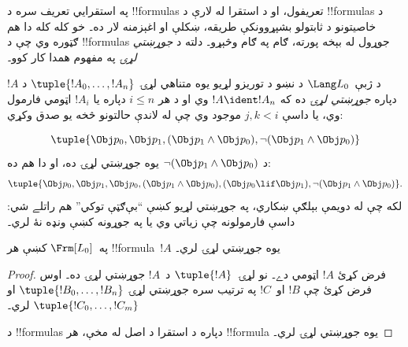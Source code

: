 \documentclass[../../../include/open-logic-section]{subfiles}
\begin{document}


په استقرايي تعريف سره د !!{formula}s تعريفول، او د استقرا له لارې
د !!{formula}s د خاصيتونو د ثابتولو بشپړوونکې طريقه، ښکلې او اغېزمنه
لار ده۔ خو کله کله دا هم ګټوره وي چې د !!{formula}s جوړول له بېخه
پورته، ګام په ګام وڅېړو۔ دلته د \emph{جوړښتي لړۍ} په مفهوم همدا کار
کوو۔

\begin{defn}
د ژبې~$\Lang L_0$ د نښو د توريزو لړيو يوه متناهي لړۍ
$\tuple{!A_0,\dotsc,!A_n}$ د $!A$ دپاره \emph{جوړښتي لړۍ} ده که
$!A \ident !A_n$ وي او د هر $i \leq n$ دپاره يا $!A_i$ اټومي
فارمول وي، يا داسې $j,k < i$ موجود وي چې له لاندې حالتونو څخه يو
صدق وکړي:
\begin{enumerate}
\end{enumerate}
\end{defn}

\begin{ex}
\[
\tuple{
    \Obj p_0,
    \Obj p_1,
    (\Obj p_1 \land \Obj p_0),
    \lnot (\Obj p_1 \land \Obj p_0)
}
\]
د $\lnot (\Obj p_1 \land \Obj p_0)$ يوه جوړښتي لړۍ ده، او دا هم ده:
\[
\tuple{
    \Obj p_0,
    \Obj p_1,
    \Obj p_0,
    (\Obj p_1 \land \Obj p_0),
    (\Obj p_0 \lif \Obj p_1),
    \lnot (\Obj p_1 \land \Obj p_0)
}.
\]
%
لکه چې له دويمې بېلګې ښکاري، په جوړښتي لړيو کښې ``بې‌ګټې توکي''
هم راتلے شي: داسې فارمولونه چې زياتي وي يا په جوړونه کښې ونډه نۀ
لري۔
\end{ex}

\begin{prop}
په~$\Frm[L_0]$ کښې هر !!{formula}~$!A$ يوه جوړښتي لړۍ لري۔
\end{prop}

\begin{proof}
فرض کړئ $!A$ اټومي دے۔ نو لړۍ~$\tuple{!A}$ د~$!A$ جوړښتي لړۍ ده۔
%
اوس فرض کړئ چې $!B$ او~$!C$ په ترتيب سره جوړښتي لړۍ
$\tuple{!B_0,\dotsc,!B_n}$ او $\tuple{!C_0,\dotsc,!C_m}$ لري۔
%
\begin{enumerate}
\end{enumerate}
د !!{formula}s دپاره د استقرا د اصل له مخې، هر !!{formula} يوه
جوړښتي لړۍ لري۔
\end{proof}
\end{document}
